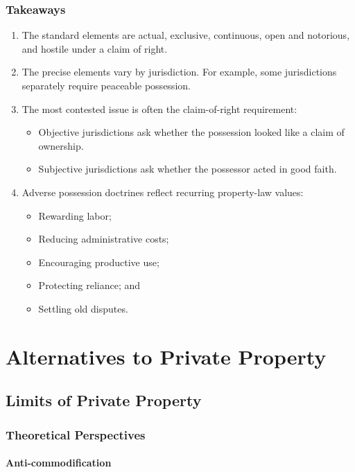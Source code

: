 \documentclass[11pt]{tex/lawoutline}
\begin{document}
\subsection{Takeaways}{
\begin{enumerate}
    \item The standard elements are actual, exclusive, continuous, open and notorious, and hostile under a claim of right.
    \item The precise elements vary by jurisdiction. For example, some jurisdictions separately require peaceable possession.
    \item The most contested issue is often the claim-of-right requirement:
    \begin{itemize}
        \item Objective jurisdictions ask whether the possession looked like a claim of ownership.
        \item Subjective jurisdictions ask whether the possessor acted in good faith.
    \end{itemize}
    \item Adverse possession doctrines reflect recurring property-law values:
    \begin{itemize}
        \item Rewarding labor;
        \item Reducing administrative costs;
        \item Encouraging productive use;
        \item Protecting reliance; and
        \item Settling old disputes.
    \end{itemize}
\end{enumerate}
}


\chapter{Alternatives to Private Property}

\section{Limits of Private Property}

\subsection{Theoretical Perspectives}

\subsubsection{Anti-commodification}
\end{document}
